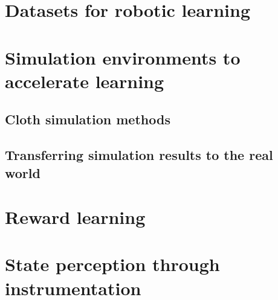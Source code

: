 \documentclass[\home/main.tex]{subfiles}
\begin{document}
\section{Datasets for robotic learning} \label{sec:lit_datasets}
\section{Simulation environments to accelerate learning} \label{sec:lit_simulation}
\subsection{Cloth simulation methods} \label{subsec:lit_cloth_sim}
\subsection{Transferring simulation results to the real world}  \label{sec:lit_sim2real}
\section{Reward learning}  \label{sec:lit_reward_learning}
\section{State perception through instrumentation} \label{sec:lit_instrumentation}
\end{document}
